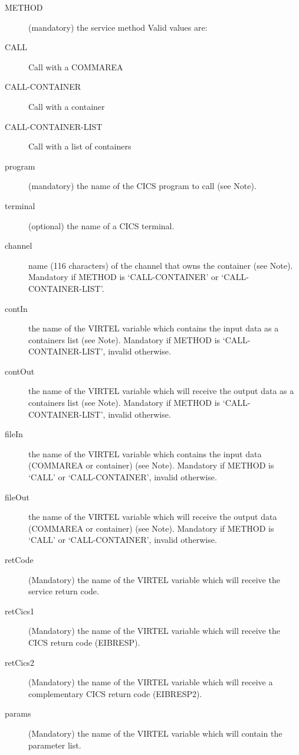 \documentclass[letterpaper,10pt,english]{sphinxmanual}
\begin{document}
\begin{description}
\item[{METHOD}] \leavevmode
(mandatory) the service method Valid values are:

\item[{CALL}] \leavevmode
Call with a COMMAREA

\item[{CALL-CONTAINER}] \leavevmode
Call with a container

\item[{CALL-CONTAINER-LIST}] \leavevmode
Call with a list of containers

\item[{program}] \leavevmode
(mandatory) the name of the CICS program to call (see Note).

\item[{terminal}] \leavevmode
(optional) the name of a CICS terminal.

\item[{channel}] \leavevmode
name (1\textendash{}16 characters) of the channel that owns the container (see Note). Mandatory if METHOD is ‘CALL-CONTAINER’ or ‘CALL-CONTAINER-LIST’.

\item[{contIn}] \leavevmode
the name of the VIRTEL variable which contains the input data as a containers list (see Note). Mandatory if METHOD is ‘CALL-CONTAINER-LIST’, invalid otherwise.

\item[{contOut}] \leavevmode
the name of the VIRTEL variable which will receive the output data as a containers list (see Note). Mandatory if METHOD is ‘CALL-CONTAINER-LIST’, invalid otherwise.

\item[{fileIn}] \leavevmode
the name of the VIRTEL variable which contains the input data (COMMAREA or container) (see Note). Mandatory if METHOD is ‘CALL’ or ‘CALL-CONTAINER’, invalid otherwise.

\item[{fileOut}] \leavevmode
the name of the VIRTEL variable which will receive the output data (COMMAREA or container) (see Note). Mandatory if METHOD is ‘CALL’ or ‘CALL-CONTAINER’, invalid otherwise.

\item[{retCode}] \leavevmode
(Mandatory) the name of the VIRTEL variable which will receive the service return code.

\item[{retCics1}] \leavevmode
(Mandatory) the name of the VIRTEL variable which will receive the CICS return code (EIBRESP).

\item[{retCics2}] \leavevmode
(Mandatory) the name of the VIRTEL variable which will receive a complementary CICS return code (EIBRESP2).

\item[{params}] \leavevmode
(Mandatory) the name of the VIRTEL variable which will contain the parameter list.

\end{description}
\end{document}
